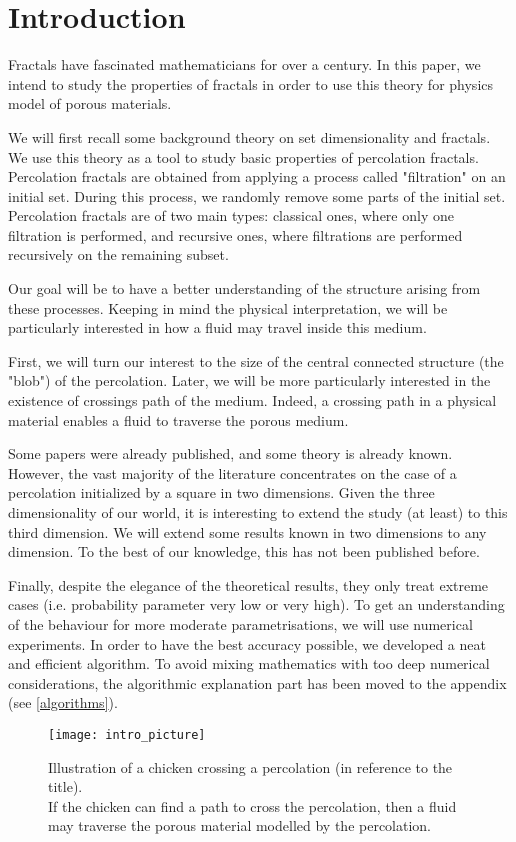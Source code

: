 \setcounter{section}{-1}
\section{Introduction}

Fractals have fascinated mathematicians for over a century.
In this paper, we intend to study the properties of fractals in order to use this theory for physics model of porous materials.

We will first recall some background theory on set dimensionality and fractals.
We use this theory as a tool to study basic properties of percolation fractals.
Percolation fractals are obtained from applying a process called "filtration" on an initial set.
During this process, we randomly remove some parts of the initial set.
Percolation fractals are of two main types: classical ones, where only one filtration is performed, and recursive ones, where filtrations are performed recursively on the remaining subset.

Our goal will be to have a better understanding of the structure arising from these processes.
Keeping in mind the physical interpretation, we will be particularly interested in how a fluid may travel inside this medium.

First, we will turn our interest to the size of the central connected structure (the "blob") of the percolation.
Later, we will be more particularly interested in the existence of crossings path of the medium.
Indeed, a crossing path in a physical material enables a fluid to traverse the porous medium.

Some papers were already published, and some theory is already known.
However, the vast majority of the literature concentrates on the case of a percolation initialized by a square in two dimensions.
Given the three dimensionality of our world, it is interesting to extend the study (at least) to this third dimension.
We will extend some results known in two dimensions to any dimension.
To the best of our knowledge, this has not been published before.

Finally, despite the elegance of the theoretical results, they only treat extreme cases (i.e. probability parameter very low or very high).
To get an understanding of the behaviour for more moderate parametrisations, we will use numerical experiments.
In order to have the best accuracy possible, we developed a neat and efficient algorithm.
To avoid mixing mathematics with too deep numerical considerations, the algorithmic explanation part has been moved to the appendix (see \ref{algorithms}).

\begin{figure}[!h]
	\vspace{1cm}
	\texttt{[image: intro\_picture]}
	\centering
	\caption{Illustration of a chicken crossing a percolation (in reference to the title).\\
	If the chicken can find a path to cross the percolation, then a fluid may traverse the porous material modelled by the percolation.}
	\label{fig:introRecursivePercolation}
\end{figure}
